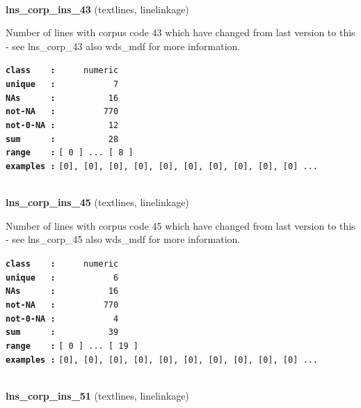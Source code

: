 \documentclass[]{article}
\begin{document}
~

\textbf{lns\_corp\_ins\_43} (textlines, linelinkage)

Number of lines with corpus code 43 which have changed from last version
to this - see lns\_corp\_43 also wds\_mdf for more information.

\textbf{\texttt{class\ \ \ \ :}} \texttt{~~~~~numeric}\\
\textbf{\texttt{unique\ \ \ :}} \texttt{~~~~~~~~~~~7}\\
\textbf{\texttt{NAs\ \ \ \ \ \ :}} \texttt{~~~~~~~~~~16}\\
\textbf{\texttt{not-NA\ \ \ :}} \texttt{~~~~~~~~~770}\\
\textbf{\texttt{not-0-NA\ :}} \texttt{~~~~~~~~~~12}\\
\textbf{\texttt{sum\ \ \ \ \ \ :}} \texttt{~~~~~~~~~~28}\\
\textbf{\texttt{range\ \ \ \ :}}
\texttt{{[}\ 0\ {]}\ ...\ {[}\ 8\ {]}}\\
\textbf{\texttt{examples\ :}}
\texttt{{[}0{]},\ {[}0{]},\ {[}0{]},\ {[}0{]},\ {[}0{]},\ {[}0{]},\ {[}0{]},\ {[}0{]},\ {[}0{]},\ {[}0{]}\ ...}\\

~

\textbf{lns\_corp\_ins\_45} (textlines, linelinkage)

Number of lines with corpus code 45 which have changed from last version
to this - see lns\_corp\_45 also wds\_mdf for more information.

\textbf{\texttt{class\ \ \ \ :}} \texttt{~~~~~numeric}\\
\textbf{\texttt{unique\ \ \ :}} \texttt{~~~~~~~~~~~6}\\
\textbf{\texttt{NAs\ \ \ \ \ \ :}} \texttt{~~~~~~~~~~16}\\
\textbf{\texttt{not-NA\ \ \ :}} \texttt{~~~~~~~~~770}\\
\textbf{\texttt{not-0-NA\ :}} \texttt{~~~~~~~~~~~4}\\
\textbf{\texttt{sum\ \ \ \ \ \ :}} \texttt{~~~~~~~~~~39}\\
\textbf{\texttt{range\ \ \ \ :}}
\texttt{{[}\ 0\ {]}\ ...\ {[}\ 19\ {]}}\\
\textbf{\texttt{examples\ :}}
\texttt{{[}0{]},\ {[}0{]},\ {[}0{]},\ {[}0{]},\ {[}0{]},\ {[}0{]},\ {[}0{]},\ {[}0{]},\ {[}0{]},\ {[}0{]}\ ...}\\

~

\textbf{lns\_corp\_ins\_51} (textlines, linelinkage)
\end{document}
